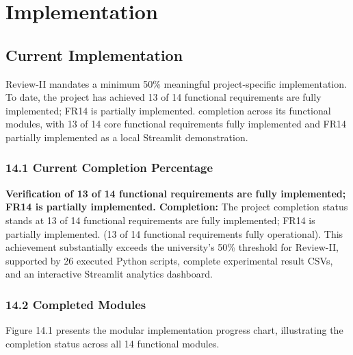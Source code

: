 \chapter{Implementation}



\section{Current Implementation}

Review-II mandates a minimum 50\% meaningful project-specific implementation. To date, the project has achieved 13 of 14 functional requirements are fully implemented; FR14 is partially implemented. completion across its functional modules, with 13 of 14 core functional requirements fully implemented and FR14 partially implemented as a local Streamlit demonstration.

\subsection{14.1 Current Completion Percentage}

\textbf{Verification of 13 of 14 functional requirements are fully implemented; FR14 is partially implemented. Completion:} The project completion status stands at 13 of 14 functional requirements are fully implemented; FR14 is partially implemented. (13 of 14 functional requirements fully operational). This achievement substantially exceeds the university's 50\% threshold for Review-II, supported by 26 executed Python scripts, complete experimental result CSVs, and an interactive Streamlit analytics dashboard.

\subsection{14.2 Completed Modules}

Figure 14.1 presents the modular implementation progress chart, illustrating the completion status across all 14 functional modules.

